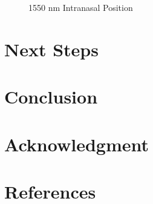 \documentclass[journal,twoside,web]{ieeecolor}
\begin{document}
\begin{figure}[!htb]
    \caption{\label{fig:1550-Intra} 1550 nm Intranasal Position}
\end{figure}

\section{Next Steps}
\label{sec:next steps}

\section{Conclusion}
\label{sec:conclusion}

\section*{Acknowledgment}

\section*{References}
\end{document}
